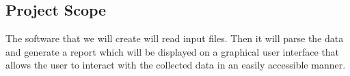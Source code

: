 \subsection{Project Scope}

The software that we will create will read input files. Then it will parse the data and generate a report which will be displayed on a graphical user interface that allows the user to interact with the collected data in an easily accessible manner.

